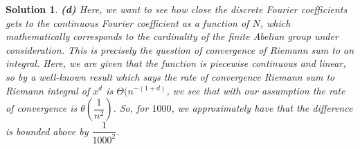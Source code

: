 \documentclass{article} %
\theoremstyle{quest}
\newtheorem*{solution}{Solution}
\begin{document}
\begin{solution}
\bigskip

\textbf{(d)} Here, we want to see how close the discrete Fourier coefficients gets to the continuous 
Fourier coefficient as a function of $N$, which mathematically corresponds to the cardinality of the
finite Abelian group under consideration. This is precisely the question of convergence of Riemann sum
to an integral. Here, we are given that the function is piecewise continuous and linear, so by a well-known
result which says the rate of convergence Riemann sum to Riemann integral of $x^d$ is $\Theta(n^{-(1+d)}$,
we see that with our assumption the rate of convergence is $\theta(\dfrac{1}{n^2})$. So, for $1000$,
we approximately have that the difference is bounded above by $\dfrac{1}{1000^2}$. 


\end{solution}

\newpage
\end{document}
